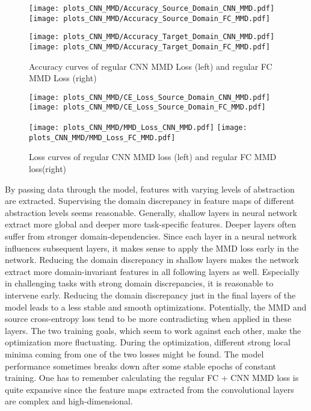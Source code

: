 \begin{figure}[H]
  \centering
  \texttt{[image: plots\_CNN\_MMD/Accuracy\_Source\_Domain\_CNN\_MMD.pdf]}
  \hspace{.3cm}
  \texttt{[image: plots\_CNN\_MMD/Accuracy\_Source\_Domain\_FC\_MMD.pdf]}

  \vspace{.1cm}

  \texttt{[image: plots\_CNN\_MMD/Accuracy\_Target\_Domain\_CNN\_MMD.pdf]}
  \hspace{.1cm}
  \texttt{[image: plots\_CNN\_MMD/Accuracy\_Target\_Domain\_FC\_MMD.pdf]}

  \caption{Accuracy curves of regular CNN MMD Loss (left) and regular FC MMD Loss (right)}
  \label{fig:accuracy_cnn_and_no_cnn_mmd}
\end{figure}

\begin{figure}[H]
  \centering
  \texttt{[image: plots\_CNN\_MMD/CE\_Loss\_Source\_Domain\_CNN\_MMD.pdf]}
  \hspace{.3cm}
  \texttt{[image: plots\_CNN\_MMD/CE\_Loss\_Source\_Domain\_FC\_MMD.pdf]}

  \vspace{.1cm}

  \texttt{[image: plots\_CNN\_MMD/MMD\_Loss\_CNN\_MMD.pdf]}
  \hspace{.1cm}
  \texttt{[image: plots\_CNN\_MMD/MMD\_Loss\_FC\_MMD.pdf]}

  \caption{Loss curves of regular CNN MMD loss (left) and regular FC MMD loss(right)}
  \label{fig:loss_cnn_and_no_cnn_mmd}
\end{figure}

By passing data through the model, features with varying levels of abstraction are extracted. Supervising the domain discrepancy in feature maps of different abstraction levels seems reasonable. Generally, shallow layers in neural network extract more global and deeper more task-specific features. Deeper layers often suffer from stronger domain-dependencies. Since each layer in a neural network influences subsequent layers, it makes sense to apply the MMD loss early in the network. Reducing the domain discrepancy in shallow layers makes the network extract more domain-invariant features in all following layers as well. Especially in challenging tasks with strong domain discrepancies, it is reasonable to intervene early. Reducing the domain discrepancy just in the final layers of the model leads to a less stable and smooth optimizations. Potentially, the MMD and source cross-entropy loss tend to be more contradicting when applied in these layers. The two training goals, which seem to work against each other, make the optimization more fluctuating. During the optimization, different strong local minima coming from one of the two losses might be found. The model performance sometimes breaks down after some stable epochs of constant training. One has to remember calculating the regular FC + CNN MMD loss is quite expansive since the feature maps extracted from the convolutional layers are complex and high-dimensional.



